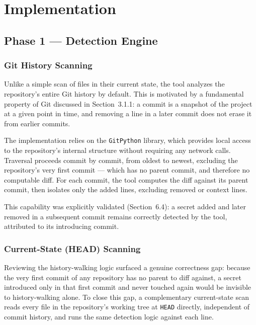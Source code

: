 \documentclass[12pt]{article}
\begin{document}
\newpage

\section{Implementation}

\subsection{Phase 1 --- Detection Engine}

\subsubsection{Git History Scanning}

Unlike a simple scan of files in their current state, the tool analyzes the repository's entire Git history by default. This is motivated by a fundamental property of Git discussed in Section~3.1.1: a commit is a snapshot of the project at a given point in time, and removing a line in a later commit does not erase it from earlier commits.

The implementation relies on the \texttt{GitPython} library, which provides local access to the repository's internal structure without requiring any network calls. Traversal proceeds commit by commit, from oldest to newest, excluding the repository's very first commit --- which has no parent commit, and therefore no computable diff. For each commit, the tool computes the diff against its parent commit, then isolates only the added lines, excluding removed or context lines.

This capability was explicitly validated (Section~6.4): a secret added and later removed in a subsequent commit remains correctly detected by the tool, attributed to its introducing commit.

\subsubsection{Current-State (HEAD) Scanning}

Reviewing the history-walking logic surfaced a genuine correctness gap: because the very first commit of any repository has no parent to diff against, a secret introduced only in that first commit and never touched again would be invisible to history-walking alone. To close this gap, a complementary current-state scan reads every file in the repository's working tree at \texttt{HEAD} directly, independent of commit history, and runs the same detection logic against each line.
\end{document}
